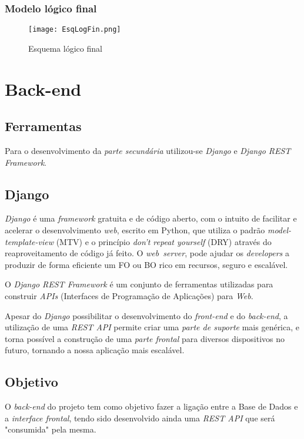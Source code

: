 \documentclass[11pt,a4paper]{report}
\begin{document}
\subsection{Modelo lógico final}

\begin{figure}[h]
\centering
\texttt{[image: EsqLogFin.png]}
\caption{Esquema lógico final}
\label{fig:EsqLogFini}
\end{figure}

\chapter{Back-end}

\section{Ferramentas}

Para o desenvolvimento da  \emph{parte secundária} utilizou-se \emph{Django} e \emph{Django REST Framework}.

\section{Django}

\emph{Django} é uma \emph{framework} gratuita e de código aberto, com o intuito de facilitar e acelerar o desenvolvimento \emph{web}, escrito em Python, que utiliza o padrão \emph{model-template-view} (MTV) e o princípio \emph{don't repeat yourself} (DRY) através do reaproveitamento de código já feito. O \emph{web\ server}, pode ajudar os \emph{developers} a produzir de forma eficiente um FO ou BO rico em recursos, seguro e escalável.

O \emph{Django REST Framework} é um conjunto de ferramentas utilizadas para construir \emph{APIs} (Interfaces de Programação de Aplicações) para \emph{Web}.

Apesar do \emph{Django} possibilitar o desenvolvimento do \emph{front-end} e do \emph{back-end}, a utilização de uma \emph{REST API} permite criar uma \emph{parte de suporte} mais genérica, e torna possível a construção de uma \emph{parte frontal} para diversos dispositivos no futuro, tornando a nossa aplicação mais escalável. 

\section{Objetivo}

O \emph{back-end} do projeto tem como objetivo fazer a ligação entre a Base de Dados e a \emph{interface frontal}, tendo sido desenvolvido ainda uma \emph{REST API} que será "consumida" pela mesma.
\newpage
\end{document}
